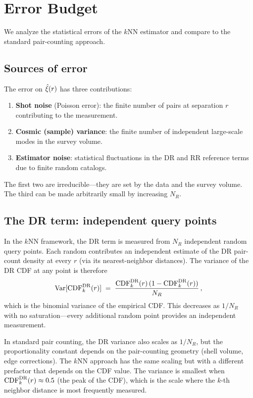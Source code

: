 \section{Error Budget}
\label{sec:errors}

We analyze the statistical errors of the $k$NN estimator and compare to the standard pair-counting approach.

\subsection{Sources of error}
\label{sec:error_sources}

The error on $\hat{\xi}(r)$ has three contributions:
\begin{enumerate}[nosep]
  \item \textbf{Shot noise} (Poisson error): the finite number of pairs at separation $r$ contributing to the measurement.
  \item \textbf{Cosmic (sample) variance}: the finite number of independent large-scale modes in the survey volume.
  \item \textbf{Estimator noise}: statistical fluctuations in the DR and RR reference terms due to finite random catalogs.
\end{enumerate}
The first two are irreducible---they are set by the data and the survey volume.  The third can be made arbitrarily small by increasing $N_R$.

\subsection{The DR term: independent query points}
\label{sec:dr_error}

In the $k$NN framework, the DR term is measured from $N_R$ independent random query points.  Each random contributes an independent estimate of the DR pair-count density at every $r$ (via its nearest-neighbor distances).  The variance of the DR CDF at any point is therefore
\begin{equation}
  \mathrm{Var}[\mathrm{CDF}^{\mathrm{DR}}_k(r)] \;=\; \frac{\mathrm{CDF}^{\mathrm{DR}}_k(r)\,(1 - \mathrm{CDF}^{\mathrm{DR}}_k(r))}{N_R}\,,
  \label{eq:var_DR}
\end{equation}
which is the binomial variance of the empirical CDF.  This decreases as $1/N_R$ with no saturation---every additional random point provides an independent measurement.

In standard pair counting, the DR variance also scales as $1/N_R$, but the proportionality constant depends on the pair-counting geometry (shell volume, edge corrections).  The $k$NN approach has the same scaling but with a different prefactor that depends on the CDF value.  The variance is smallest when $\mathrm{CDF}^{\mathrm{DR}}_k(r) \approx 0.5$ (the peak of the CDF), which is the scale where the $k$-th neighbor distance is most frequently measured.


